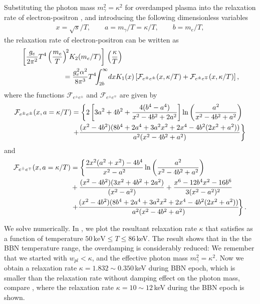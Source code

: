 Substituting the photon mass $m^2_\gamma=\kappa^2$ for overdamped plasma into the relaxation rate of electron-positron , and introducing the following dimensionless variables
\begin{align}
x=\sqrt{s}/T,\qquad a=m_\gamma/T=\kappa/T,\qquad b=m_e/T,
\end{align}
the relaxation rate of electron-positron can be written as
\begin{align}\label{Numerical_eq}
&\left[\frac{g_e}{2\pi^2}T^4\left(\frac{m_e}{T}\right)^{\!2}\!K_2(m_e/T)\right]\,\left(\frac{\kappa}{T}\right)\notag\\
&\qquad\qquad\qquad=\frac{g^2_e\alpha^2}{8\pi^3}T^4\!\!\int_{2b}^\infty\!dxK_1(x)\left[\mathcal{F}_{e^\pm e^\pm}(x,\kappa/T)+\mathcal{F}_{e^\pm e^\mp}(x,\kappa/T)\right],
\end{align}
where the functions $\mathcal{F}_{e^\pm e^\pm}$ and $\mathcal{F}_{e^\pm e^\mp}$ are given by
\begin{align}
\mathcal{F}_{e^\pm e^\pm}(x,a=\kappa/T)&=\left\{2\left[3a^2+4b^2+\frac{4(b^4-a^4)}{x^2-4b^2+2a^2}\right]\ln\left(\frac{a^2}{x^2-4b^2+a^2}\right)\right.\notag\\
&\left.+\frac{(x^2-4b^2)(8b^4+2a^4+3a^2x^2+2x^4-4b^2(2x^2+a^2))}{a^2(x^2-4b^2+a^2)}\right\}
\end{align}
and 
\begin{align}
\mathcal{F}_{e^\pm e^\mp}(x,a=\kappa/T)&=\left\{\frac{2x^2(a^2+x^2)-4b^4}{x^2-a^2}\ln\left(\frac{a^2}{x^2-4b^2+a^2}\right)\right.\notag\\
&+\frac{(x^2-4b^2)(3x^2+4b^2+2a^2)}{(x^2-a^2)}+\frac{x^6-12b^4x^2-16b^6}{3(x^2-a^2)^2}\notag\\
&\left.+\frac{(x^2-4b^2)(8b^4+2a^4+3a^2x^2+2x^4-4b^2(2x^2+a^2))}{a^2(x^2-4b^2+a^2)}\!\right\}.
\end{align}

We solve  numerically. In , we plot the resultant relaxation rate $\kappa$ that satisfies  as a function of temperature $50\,\mathrm{keV} \leqslant T\leqslant 86$\,keV. The result shows that in the the BBN temperature range, the overdamping is considerably reduced: We remember that we started with   $w_{pl}<\kappa$, and the effective photon mass $m^2_\gamma=\kappa^2$. Now we obtain a relaxation rate $\kappa=1.832\sim 0.350$\,keV during  BBN epoch, which is smaller than the relaxation rate without damping effect on the photon mass, compare , where the relaxation rate $\kappa=10\sim12$\,keV during the BBN epoch is shown.

